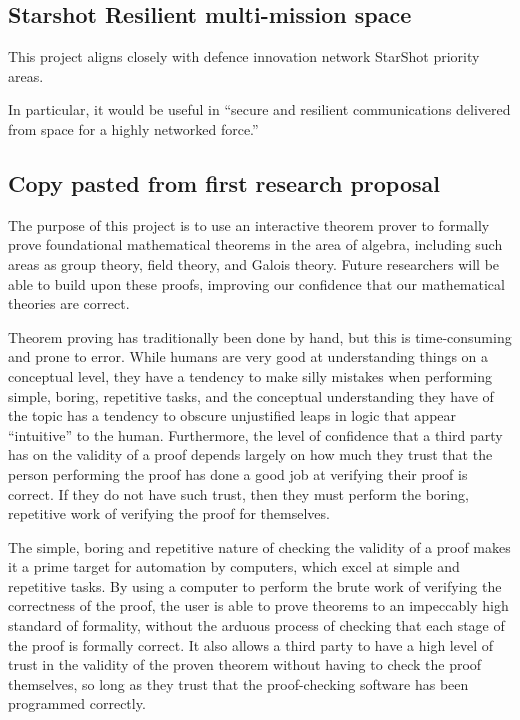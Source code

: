 \documentclass{article}
\begin{document}
\subsection{Starshot Resilient multi-mission space}

This project aligns closely with defence innovation network StarShot priority areas.

In particular, it would be useful in ``secure and resilient communications delivered from space for a highly networked force.''

\subsection {Copy pasted from first research proposal}

The purpose of this project is to use an interactive theorem prover to formally prove foundational mathematical theorems in the area of algebra, including such areas as group theory, field theory, and Galois theory. Future researchers will be able to build upon these proofs, improving our confidence that our mathematical theories are correct.

Theorem proving has traditionally been done by hand, but this is time-consuming and prone to error. While humans are very good at understanding things on a conceptual level, they have a tendency to make silly mistakes when performing simple, boring, repetitive tasks, and the conceptual understanding they have of the topic has a tendency to obscure unjustified leaps in logic that appear “intuitive” to the human. Furthermore, the level of confidence that a third party has on the validity of a proof depends largely on how much they trust that the person performing the proof has done a good job at verifying their proof is correct. If they do not have such trust, then they must perform the boring, repetitive work of verifying the proof for themselves.

The simple, boring and repetitive nature of checking the validity of a proof makes it a prime target for automation by computers, which excel at simple and repetitive tasks. By using a computer to perform the brute work of verifying the correctness of the proof, the user is able to prove theorems to an impeccably high standard of formality, without the arduous process of checking that each stage of the proof is formally correct. It also allows a third party to have a high level of trust in the validity of the proven theorem without having to check the proof themselves, so long as they trust that the proof-checking software has been programmed correctly.
\end{document}
